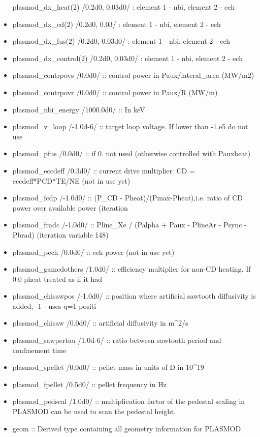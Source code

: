 \documentclass[
]{article}
\begin{document}
\begin{itemize}
  plasmod\_dx\_heat(2) /0.2d0, 0.03d0/ : element 1 - nbi, element 2 -
  ech
\item
  plasmod\_dx\_cd(2) /0.2d0, 0.03/ : element 1 - nbi, element 2 - ech
\item
  plasmod\_dx\_fus(2) /0.2d0, 0.03d0/ : element 1 - nbi, element 2 - ech
\item
  plasmod\_dx\_control(2) /0.2d0, 0.03d0/ : element 1 - nbi, element 2 -
  ech
\item
  plasmod\_contrpovs /0.0d0/ :: control power in Paux/lateral\_area
  (MW/m2)
\item
  plasmod\_contrpovr /0.0d0/ :: control power in Paux/R (MW/m)
\item
  plasmod\_nbi\_energy /1000.0d0/ :: In keV
\item
  plasmod\_v\_loop /-1.0d-6/ :: target loop voltage. If lower than -1.e5
  do not use
\item
  plasmod\_pfus /0.0d0/ :: if 0. not used (otherwise controlled with
  Pauxheat)
\item
  plasmod\_eccdeff /0.3d0/ :: current drive multiplier: CD =
  eccdeff*PCD*TE/NE (not in use yet)
\item
  plasmod\_fcdp /-1.0d0/ :: (P\_CD - Pheat)/(Pmax-Pheat),i.e. ratio of
  CD power over available power (iteration
\item
  plasmod\_fradc /-1.0d0/ :: Pline\_Xe / (Palpha + Paux - PlineAr -
  Psync - Pbrad) (iteration variable 148)
\item
  plasmod\_pech /0.0d0/ :: ech power (not in use yet)
\item
  plasmod\_gamcdothers /1.0d0/ :: efficiency multiplier for non-CD
  heating. If 0.0 pheat treated as if it had
\item
  plasmod\_chisawpos /-1.0d0/ :: position where artificial sawtooth
  diffusivity is added, -1 - uses q=1 positi
\item
  plasmod\_chisaw /0.0d0/ :: artificial diffusivity in m\^{}2/s
\item
  plasmod\_sawpertau /1.0d-6/ :: ratio between sawtooth period and
  confinement time
\item
  plasmod\_spellet /0.0d0/ :: pellet mass in units of D in 10\^{}19
\item
  plasmod\_fpellet /0.5d0/ :: pellet frequency in Hz
\item
  plasmod\_pedscal /1.0d0/ :: multiplication factor of the pedestal
  scaling in PLASMOD can be used to scan the pedestal height.
\item
  geom :: Derived type containing all geometry information for PLASMOD

\end{itemize}
\end{document}
